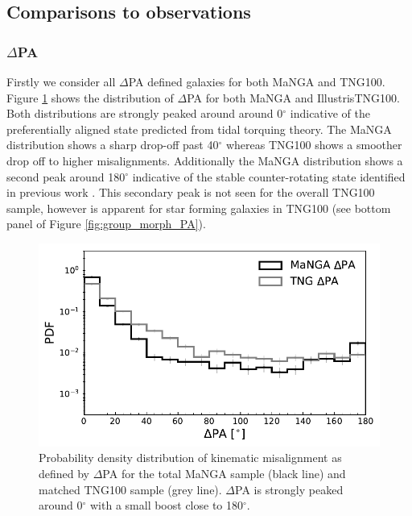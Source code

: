 \subsection{Comparisons to observations} \label{sec:manga_tng_comp}
\subsubsection{$\Delta$PA}
Firstly we consider all $\Delta$PA defined galaxies for both MaNGA and TNG100. Figure \ref{fig:total_pa_dist} shows the distribution of $\Delta$PA for both MaNGA and IllustrisTNG100. Both distributions are strongly peaked around around 0$^{\circ}$ indicative of the preferentially aligned state predicted from tidal torquing theory. The MaNGA distribution shows a sharp drop-off past 40$^{\circ}$ whereas TNG100 shows a smoother drop off to higher misalignments. Additionally the MaNGA distribution shows a second peak around 180$^{\circ}$ indicative of the stable counter-rotating state identified in previous work \citep[e.g.][]{chen2016}. This secondary peak is not seen for the overall TNG100 sample, however is apparent for star forming galaxies in TNG100 (see bottom panel of Figure \ref{fig:group_morph_PA}). 

\begin{figure}
    \centering
	\includegraphics[width=0.85\linewidth]{misalignment_TNG/mpl8_pa_dist.pdf}
    \caption{Probability density distribution of kinematic misalignment as defined by $\Delta$PA for the total MaNGA sample (black line) and matched TNG100 sample (grey line). $\Delta$PA is strongly peaked around 0$^{\circ}$ with a small boost close to 180$^{\circ}$.}
    \label{fig:total_pa_dist}
\end{figure}

